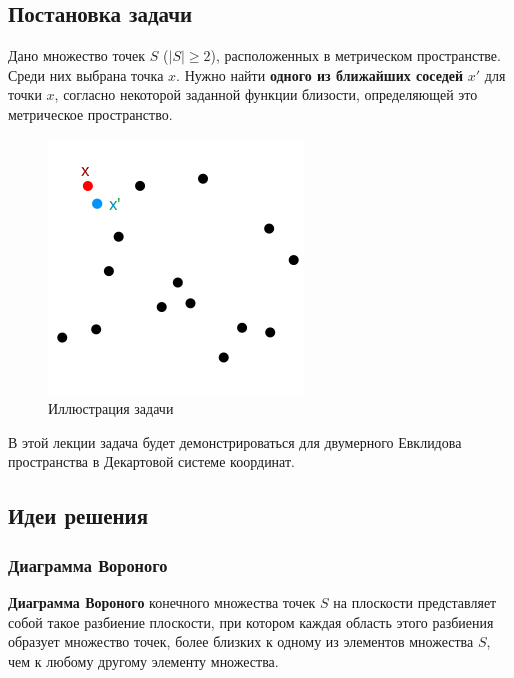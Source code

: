 
\subsection{Постановка задачи}

Дано множество точек $S$ ($|S| \geq 2$), расположенных в метрическом пространстве. Среди них выбрана точка $x$.
Нужно найти \textbf{одного из ближайших соседей} $x'$ для точки $x$, согласно некоторой заданной функции близости, определяющей это метрическое пространство.

\begin{figure}[H]
    \centering
    \includegraphics[width=0.6\linewidth]{points.png}
    \caption{Иллюстрация задачи}
\end{figure}

В этой лекции задача будет демонстрироваться для двумерного Евклидова пространства в Декартовой системе координат.

\subsection{Идеи решения}

\subsubsection*{Диаграмма Вороного}

\textbf{Диаграмма Вороного} конечного множества точек $S$ на плоскости представляет собой такое разбиение плоскости, при котором каждая область этого разбиения образует множество точек, более близких к одному из элементов множества $S$, чем к любому другому элементу множества.

